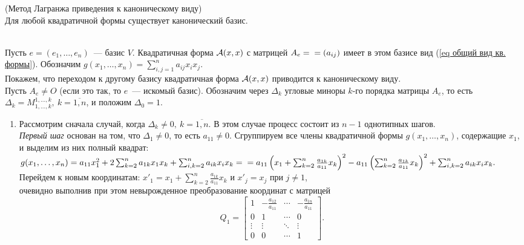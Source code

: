 \begin{theorem}
\label{th метод Лагранжа}
(Метод Лагранжа приведения к каноническому виду)\\
Для любой квадратичной формы существует канонический базис.
\end{theorem}
\begin{proofocre}
~\\
Пусть $e=(e_1,\ldots,e_n)$~--- базис $V$. Квадратичная форма ${\mathcal{A}}(x,x)$ с матрицей $A_e=\\=(a_{ij})$ имеет в этом базисе вид (\ref{eq общий вид кв. формы}). Обозначим $g(x_1,\ldots,x_n)=\sum_{i,j=1}^na_{ij}x_ix_j$.\\
Покажем, что переходом к другому базису квадратичная форма ${\mathcal{A}}(x,x)$ приводится к каноническому виду.\\
Пусть $A_e\neq O$ (если это так, то $e$~--- искомый базис). Обозначим через $\Delta_k$ угловые миноры $k$-го порядка матрицы $A_e$, то есть $\Delta_k=M_{1,\ldots,k}^{1,\ldots,k},~k=\overline{1,n}$, и положим $\Delta_0=1$.
\begin{enumerate}
    \item Рассмотрим сначала случай, когда $\Delta_k\neq 0,~k=\overline{1,n}$. В этом случае процесс состоит из $n-1$ однотипных шагов.\\
    \emph{Первый шаг} основан на том, что $\Delta_1\neq 0$, то есть $a_{11}\neq 0$. Сгруппируем все члены квадратичной формы $g(x_1,\ldots,x_n)$, содержащие $x_1$, и выделим из них полный квадрат:\\
    $g(x_1,\ldots,x_n)=a_{11}x_1^2+2\sum_{k=2}^na_{1k}x_1x_k+\sum_{i,k=2}^na_{ik}x_ix_k=\\=a_{11}\left(x_1+\sum_{k=2}^n\frac{a_{1k}}{a_{11}}x_k \right)^2-a_{11}\left(\sum_{k=2}^n\frac{a_{1k}}{a_{11}}x_k\right)^2+\sum_{i,k=2}^na_{ik}x_ix_k.$\\
    Перейдем к новым координатам:
    $x'_1=x_1+\sum_{k=2}^n\frac{a_{1k}}{a_{11}}x_k$ и $x'_j=x_j$ при $j\neq 1$,\\
    очевидно выполнив при этом невырожденное преобразование координат с матрицей
    \begin{equation}
        Q_1=
        \begin{bmatrix}
            1 & -\frac{a_{12}}{a_{11}} & \cdots & -\frac{a_{1n}}{a_{11}}\\
            0 & 1 & \cdots & 0\\
            \vdots & \vdots & \ddots & \vdots\\
            0 & 0 & \cdots & 1
        \end{bmatrix}.

\end{equation}
\end{enumerate}
\end{proofocre}
